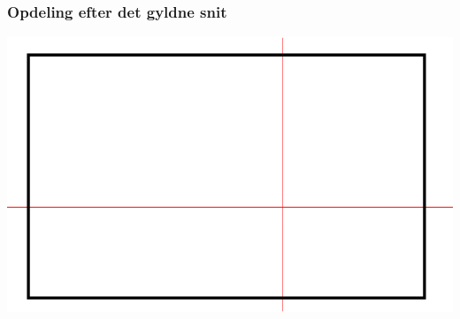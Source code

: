 \documentclass[xcolor=table]{beamer}
\begin{document}
\subsection*{}
\begin{frame}

    \frametitle{Opdeling efter det gyldne snit}

    \includegraphics[width=\textwidth]{billeder/scan_direction}

\end{frame}
\end{document}
